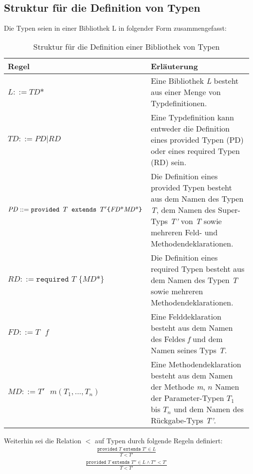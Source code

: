 \subsection{Struktur für die Definition von Typen}\label{sec:strukturTypen}
Die Typen seien in einer Bibliothek $\text{L}$ in folgender Form zusammengefasst:
\begin{table}[H]
\centering
\begin{tabular}{|p{5.5cm}|p{8.5cm}|}
\hline
\hline
\centering\textbf{Regel} & \textbf{Erläuterung} \\
\hline
\hline
$\mathit{L} ::= \mathit{TD}\text{*}$ & Eine Bibliothek \emph{L} besteht aus einer Menge von Typdefinitionen.\\
\hline
$\mathit{TD} ::= \mathit{PD} | \mathit{RD}$ & Eine Typdefinition kann entweder die Definition eines provided Typen (PD) oder eines required Typen (RD) sein.\\
\hline
$\mathit{PD} ::= \newline\texttt{provided }T \texttt{ extends } T' \newline  \texttt{\{} \mathit{FD}\text{*} \mathit{MD}\text{*}\texttt{\}}$& Die Definition eines provided Typen besteht aus dem Namen des Typen \emph{T}, dem Namen des Super-Typs \emph{T'} von \emph{T} sowie mehreren Feld- und Methodendeklarationen.\\
\hline
$\mathit{RD} ::= \texttt{required } T \texttt{ \{}\mathit{MD}\text{*}\texttt{\}}$ & Die Definition eines required Typen besteht aus dem Namen des Typen \emph{T} sowie mehreren Methodendeklarationen.\\
\hline
$\mathit{FD} ::= T \texttt{ }\mathit{f}$ & Eine Felddeklaration besteht aus dem Namen des Feldes \emph{f} und dem Namen seines Typs \emph{T}.\\
\hline
$\mathit{MD} ::= \mathit{T'}\texttt{ }\mathit{m(T_1,...,T_n)}$ & Eine Methodendeklaration besteht aus dem Namen der Methode \emph{m}, $n$ Namen der Parameter-Typen $T_1$ bis $T_n$ und dem Namen des Rückgabe-Typs \emph{T'}.\\
\hline
\hline
\end{tabular}
\caption{Struktur für die Definition einer Bibliothek von Typen}
 \label{tab_typeStruct}
\end{table}
\noindent
Weiterhin sei die Relation $<$ auf Typen durch folgende Regeln definiert:
\begin{gather*}
\frac{\texttt{provided }T \texttt{ extends } T' \in L}{T < T'}
\end{gather*}
\begin{gather*}
\frac{\texttt{provided } T \texttt{ extends } T'' \in L \wedge T'' < T'}{T < T'}
\end{gather*}

